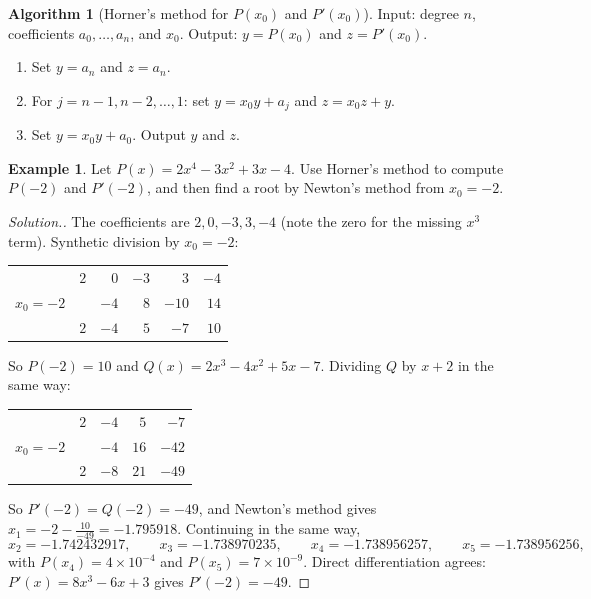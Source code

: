\documentclass[11pt,a4paper]{article}
\numberwithin{equation}{section}
\theoremstyle{definition}
\newtheorem{exa}[thm]{Example}
\newtheorem{alg}[thm]{Algorithm}
\newenvironment{solution}
  {\renewcommand{\qedsymbol}{}\begin{proof}[\textit{Solution}.]}
  {\end{proof}}
\begin{document}
\begin{alg}[Horner's method for $P(x_0)$ and $P'(x_0)$]
\label{alg:horner}
Input: degree $n$, coefficients $a_0,\dots,a_n$, and $x_0$. Output: $y = P(x_0)$ and $z = P'(x_0)$.
\begin{enumerate}[label=Step \arabic*:,leftmargin=*]
\item Set $y = a_n$ and $z = a_n$.
\item For $j = n-1, n-2,\dots,1$: set $y = x_0y+a_j$ and $z = x_0z+y$.
\item Set $y = x_0y+a_0$. Output $y$ and $z$.
\end{enumerate}
\end{alg}

\begin{exa}
\label{exa:hornernewton}
Let $P(x) = 2x^4-3x^2+3x-4$. Use Horner's method to compute $P(-2)$ and $P'(-2)$, and then find a root by Newton's method from
$x_0 = -2$.
\end{exa}

\begin{solution}
The coefficients are $2, 0, -3, 3, -4$ (note the zero for the missing $x^3$ term). Synthetic division by $x_0 = -2$:
\begin{center}
\begin{tabular}{r|rrrrr}
 & $2$ & $0$ & $-3$ & $3$ & $-4$\\
$x_0 = -2$ & & $-4$ & $8$ & $-10$ & $14$\\
\hline
 & $2$ & $-4$ & $5$ & $-7$ & $10$\\
\end{tabular}
\end{center}
So $P(-2) = 10$ and $Q(x) = 2x^3-4x^2+5x-7$. Dividing $Q$ by $x+2$ in the same way:
\begin{center}
\begin{tabular}{r|rrrr}
 & $2$ & $-4$ & $5$ & $-7$\\
$x_0 = -2$ & & $-4$ & $16$ & $-42$\\
\hline
 & $2$ & $-8$ & $21$ & $-49$\\
\end{tabular}
\end{center}
So $P'(-2) = Q(-2) = -49$, and Newton's method gives $x_1 = -2-\frac{10}{-49} = -1.795918$. Continuing in the same way,
$$x_2 = -1.742432917,\qquad x_3 = -1.738970235,\qquad x_4 = -1.738956257,\qquad x_5 = -1.738956256,$$
with $P(x_4) = 4\times10^{-4}$ and $P(x_5) = 7\times10^{-9}$. Direct differentiation agrees: $P'(x) = 8x^3-6x+3$ gives $P'(-2) = -49$.
\end{solution}
\end{document}
